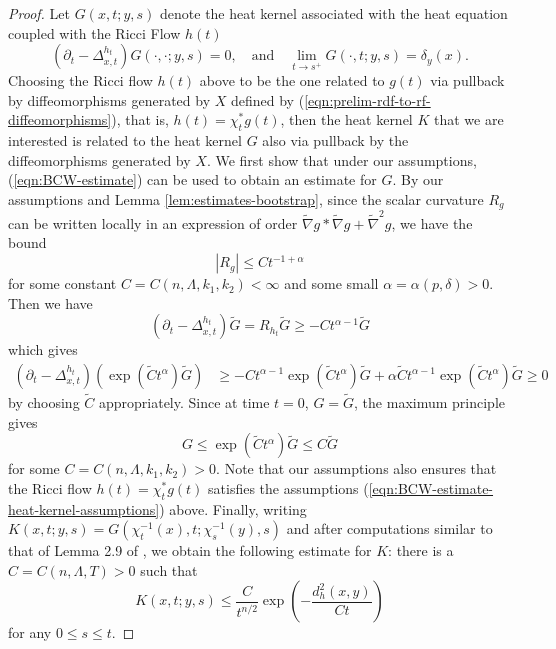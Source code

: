 \documentclass[12pt]{amsart}
\theoremstyle{plain}
\theoremstyle{plain}
\theoremstyle{definition}
\theoremstyle{remark}
\numberwithin{equation}{subsection}
\newcommand{\hdel}{\tilde{\nabla}}
\begin{document}
\begin{proof}
    Let $G(x,t;y,s)$ denote the heat kernel associated with the heat equation coupled with the Ricci Flow $h(t)$
    \begin{equation*}
        \left(\partial_t - \Delta^{h_t}_{x,t}\right)G(\cdot,\cdot;y,s) = 0,\quad \text{and}\quad \lim\limits_{t\to s^+}G(\cdot,t;y,s) = \delta_y(x).
    \end{equation*}
    Choosing the Ricci flow $h(t)$ above to be the one related to $g(t)$ via pullback by diffeomorphisms generated by $X$ defined by (\ref{eqn:prelim-rdf-to-rf-diffeomorphisms}), that is, $h(t) = \chi_t^\ast g(t)$, then the heat kernel $K$ that we are interested is related to the heat kernel $G$ also via pullback by the diffeomorphisms generated by $X$. We first show that under our assumptions, (\ref{eqn:BCW-estimate}) can be used to obtain an estimate for $G$. By our assumptions and Lemma \ref{lem:estimates-bootstrap}, since the scalar curvature $R_g$ can be written locally in an expression of order $\hdel g \ast \hdel g + \hdel^2 g$, we have the bound
    \begin{equation*}
        |R_g| \leq Ct^{-1+\alpha}
    \end{equation*}
    for some constant $C = C(n,\Lambda,k_1,k_2) < \infty$ and some small $\alpha = \alpha(p,\delta) > 0$. Then we have
    \begin{equation*}
        \left(\partial_t - \Delta^{h_t}_{x,t}\right)\widetilde{G} = R_{h_t}\widetilde{G} \geq -Ct^{\alpha-1}\widetilde{G}
    \end{equation*}
    which gives
    \begin{align*}
        \left(\partial_t - \Delta^{h_t}_{x,t}\right)(\exp{(\widetilde{C}t^\alpha)}\widetilde{G}) &\geq -Ct^{\alpha - 1}\exp{(\widetilde{C}t^\alpha)}\widetilde{G} + \alpha\widetilde{C}t^{\alpha-1}\exp{(\widetilde{C}t^\alpha)}\widetilde{G} \geq 0
    \end{align*}
    by choosing $\widetilde{C}$ appropriately. Since at time $t = 0$, $G = \widetilde{G}$, the maximum principle gives
    \begin{equation*}
        G \leq \exp{(\widetilde{C}t^\alpha)}\widetilde{G} \leq C\widetilde{G}
    \end{equation*}
    for some $C = C(n,\Lambda,k_1,k_2) > 0$. Note that our assumptions also ensures that the Ricci flow $h(t) = \chi_t^\ast g(t)$ satisfies the assumptions (\ref{eqn:BCW-estimate-heat-kernel-assumptions}) above. Finally, writing $K(x,t;y,s) = G(\chi_t^{-1}(x),t;\chi_s^{-1}(y),s)$ and after computations similar to that of Lemma 2.9 of \cite{burkhardt-guim_pointwise_2019}, we obtain the following estimate for $K$: there is a $C = C(n,\Lambda,T) > 0$ such that
    \begin{equation}\label{eqn:gradient-estimate-K-heat-kernel-estimate}
        K(x,t;y,s) \leq \frac{C}{t^{n/2}}\exp{\left(-\frac{d^2_h(x,y)}{Ct}\right)}
    \end{equation}
    for any $0 \leq s \leq t$.
    

\end{proof}
\end{document}
